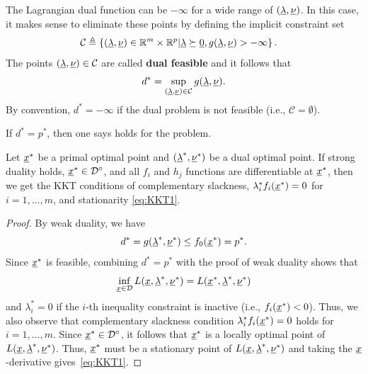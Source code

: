The Lagrangian dual function can be $-\infty$ for a wide range of $(\underline{\lambda},\underline{\nu})$.
In this case, it makes sense to eliminate these points by defining the implicit constraint set
\begin{align*}
\mathcal{C} &\triangleq \left\{ (\underline{\lambda},\underline{\nu}) \in \mathbb{R}^m \times \mathbb{R}^p | \underline{\lambda}\succeq \underline{0},  g(\underline{\lambda},\underline{\nu}) > -\infty \right\}.
\end{align*}
The points $(\underline{\lambda},\underline{\nu}) \in \mathcal{C}$ are called \textbf{dual feasible} and it follows that
\[ d^* = \sup_{(\underline{\lambda},\underline{\nu})\in \mathcal{C}} g(\underline{\lambda},\underline{\nu}). \]
By convention, $d^* = -\infty$ if the dual problem is not feasible (i.e., $\mathcal{C} = \emptyset$).

\begin{definition}
If $d^* = p^*$, then one says  holds for the problem.
\end{definition}

\begin{theorem}
Let $\underline{x}^*$ be a primal optimal point and $(\underline{\lambda}^*,\underline{\nu}^*)$ be a dual optimal point.
If strong duality holds, $\underline{x}^* \in {\mathcal{D}}^{\circ}$, and all $f_i$ and $h_j$ functions are differentiable at $\underline{x}^*$, then we get the KKT conditions of complementary slackness, $\lambda_i^* f_i (\underline{x}^*) = 0$ for $i = 1,\ldots,m$, and stationarity \eqref{eq:KKT1}.
\end{theorem}
\begin{proof}
By weak duality, we have
\[ d^* = g(\underline{\lambda}^*,\underline{\nu}^*) \leq f_0 (\underline{x}^*) = p^*. \]
Since $\underline{x}^*$ is feasible, combining $d^* = p^*$ with the proof of weak duality shows that
\[ \inf_{\underline{x}\in \mathcal{D}} L(\underline{x},\underline{\lambda}^*,\underline{\nu}^*) = L(\underline{x}^*,\underline{\lambda}^*,\underline{\nu}^*) \]
and $\lambda_i^* = 0$ if the $i$-th inequality constraint is inactive (i.e., $f_i(\underline{x}^*) < 0$).
Thus, we also observe that complementary slackness condition $\lambda_i^* f_i (\underline{x}^*) = 0$ holds for $i = 1,\ldots,m$.
Since $\underline{x}^* \in {\mathcal{D}}^{\circ}$, it follows that $\underline{x}^*$ is a locally optimal point of $L(\underline{x},\underline{\lambda}^*,\underline{\nu}^*)$.
Thus, $\underline{x}^*$ must be a stationary point of $L(\underline{x},\underline{\lambda}^*,\underline{\nu}^*)$ and taking the $\underline{x}$-derivative gives~\eqref{eq:KKT1}.
\end{proof}

